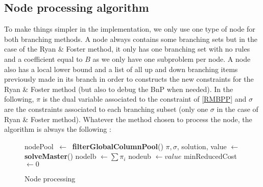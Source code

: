 \subsection{Node processing algorithm}
\label{node-process}

To make things simpler in the implementation, we only use one type of node for both branching methods. A node always contains some branching sets but in the case of the Ryan \& Foster method, it only has one branching set with no rules and a coefficient equal to $B$ as we only have one subproblem per node. A node also has a local lower bound and a list of all up and down branching items previously made in its branch in order to constructs the new constraints for the Ryan \& Foster method (but also to debug the BnP when needed). In the following, $\pi$ is the dual variable associated to the constraint of \eqref{RMBPP} and $\sigma$ are the constraints associated to each branching subset (only one $\sigma$ in the case of Ryan \& Foster method). Whatever the method chosen to process the node, the algorithm is always the following :
\begin{figure}[!ht]
	\centering
	\begin{minipage}[t]{0.75\linewidth}
		\begin{algorithm}[H]
			\DontPrintSemicolon 
			nodePool $\ \leftarrow \ $ \textbf{filterGlobalColumnPool}()\;
			$\pi, \sigma$, solution, value $ \leftarrow$ \textbf{solveMaster}()\;
			nodelb $\leftarrow \sum \pi_i$\; 
			nodeub $\leftarrow value$\; minReducedCost $\leftarrow 0$\;
			
			\caption{Node processing}
		\end{algorithm}
	\end{minipage}
\end{figure}
\newpage


